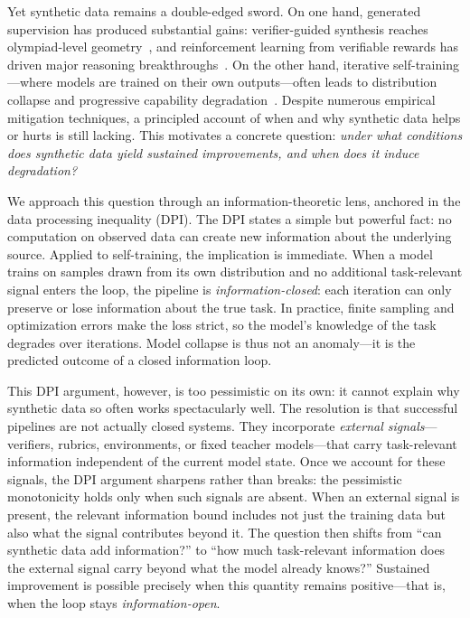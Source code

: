 \documentclass{article}
\theoremstyle{plain}
\theoremstyle{definition}
\theoremstyle{remark}
\begin{document}
Yet synthetic data remains a double-edged sword. On one hand, generated supervision has produced substantial gains: verifier-guided synthesis reaches olympiad-level geometry~\cite{trinhSolvingOlympiadGeometry2024}, and reinforcement learning from verifiable rewards has driven major reasoning breakthroughs~\cite{guoDeepSeekR1IncentivizesReasoning2025,zhengOpenCodeInterpreterIntegratingCode2024}. On the other hand, iterative self-training---where models are trained on their own outputs---often leads to distribution collapse and progressive capability degradation~\cite{shumailovAIModelsCollapse2024,alemohammadSelfConsumingGenerativeModels2024,gerstgrasserModelCollapseInevitable2024}. Despite numerous empirical mitigation techniques, a principled account of when and why synthetic data helps or hurts is still lacking. This motivates a concrete question: \textit{under what conditions does synthetic data yield sustained improvements, and when does it induce degradation?}

We approach this question through an information-theoretic lens, anchored in the data processing inequality (DPI). The DPI states a simple but powerful fact: no computation on observed data can create new information about the underlying source. Applied to self-training, the implication is immediate. When a model trains on samples drawn from its own distribution and no additional task-relevant signal enters the loop, the pipeline is \textit{information-closed}: each iteration can only preserve or lose information about the true task. In practice, finite sampling and optimization errors make the loss strict, so the model's knowledge of the task degrades over iterations. Model collapse is thus not an anomaly---it is the predicted outcome of a closed information loop.

This DPI argument, however, is too pessimistic on its own: it cannot explain why synthetic data so often works spectacularly well. The resolution is that successful pipelines are not actually closed systems. They incorporate \textit{external signals}---verifiers, rubrics, environments, or fixed teacher models---that carry task-relevant information independent of the current model state. Once we account for these signals, the DPI argument sharpens rather than breaks: the pessimistic monotonicity holds only when such signals are absent. When an external signal is present, the relevant information bound includes not just the training data but also what the signal contributes beyond it. The question then shifts from ``can synthetic data add information?'' to ``how much task-relevant information does the external signal carry beyond what the model already knows?'' Sustained improvement is possible precisely when this quantity remains positive---that is, when the loop stays \textit{information-open}.
\end{document}
